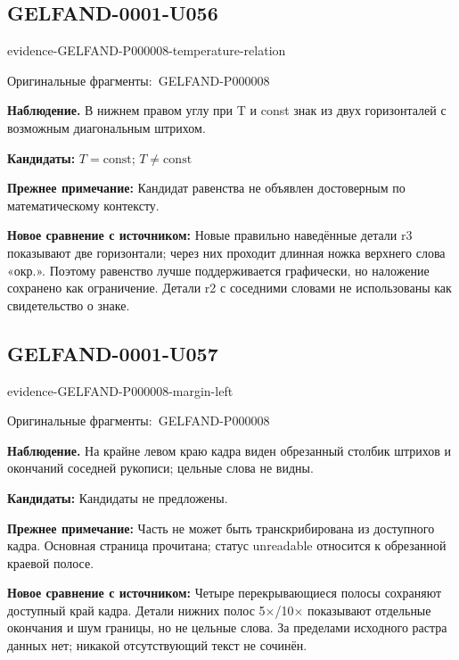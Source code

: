 \documentclass[11pt]{article}
\newcommand{\EvidenceBlock}[4]{%
 \par\smallskip\noindent\begin{minipage}{\linewidth}
 \begin{minipage}[t]{.47\linewidth}\vspace{0pt}\centering
 \csname evidence-#1-#2\endcsname\par
 {\scriptsize\SourceCropCaption\ #1}\par
 \end{minipage}\hfill
 \begin{minipage}[t]{.49\linewidth}\vspace{0pt}\raggedright
 {\small\color{orange!65!black}\textbf{#4} #3}\par
 \end{minipage}
 \end{minipage}\par\smallskip}
\newcommand{\SourceCropCaption}{Оригинальные фрагменты:}\newcommand{\ReadingCaption}{Сомнительное чтение.}\newcommand{\IncompleteCaption}{Неразобранный фрагмент.}\newcommand{\DiagramCaption}{Рисунок и набранное описание.}
\begin{document}
\subsection*{GELFAND-0001-U056}
\EvidenceBlock{GELFAND-P000008}{temperature-relation}{В нижнем правом углу при T и const знак из двух горизонталей с возможным диагональным штрихом.}{Наблюдение.}
\par\smallskip\noindent\textbf{Кандидаты: } \(T=\mathrm{const}\); \(T\ne\mathrm{const}\)\par
\par\smallskip\noindent\textbf{Прежнее примечание: } Кандидат равенства не объявлен достоверным по математическому контексту.\par
\par\smallskip\noindent\textbf{Новое сравнение с источником: } Новые правильно наведённые детали r3 показывают две горизонтали; через них проходит длинная ножка верхнего слова «окр.». Поэтому равенство лучше поддерживается графически, но наложение сохранено как ограничение. Детали r2 с соседними словами не использованы как свидетельство о знаке.\par

\subsection*{GELFAND-0001-U057}
\EvidenceBlock{GELFAND-P000008}{margin-left}{На крайне левом краю кадра виден обрезанный столбик штрихов и окончаний соседней рукописи; цельные слова не видны.}{Наблюдение.}
\par\smallskip\noindent\textbf{Кандидаты: } Кандидаты не предложены.\par
\par\smallskip\noindent\textbf{Прежнее примечание: } Часть не может быть транскрибирована из доступного кадра. Основная страница прочитана; статус unreadable относится к обрезанной краевой полосе.\par
\par\smallskip\noindent\textbf{Новое сравнение с источником: } Четыре перекрывающиеся полосы сохраняют доступный край кадра. Детали нижних полос 5×/10× показывают отдельные окончания и шум границы, но не цельные слова. За пределами исходного растра данных нет; никакой отсутствующий текст не сочинён.\par
\end{document}
